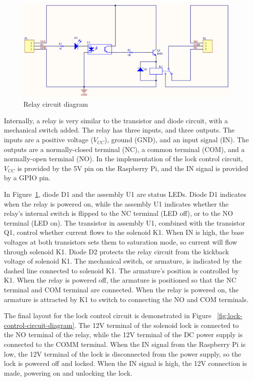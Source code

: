 \documentclass[12pt]{report}
\begin{document}
\begin{figure}
    \includegraphics[width=\textwidth]{Diagrams/Hardware-Diagrams/relay_circuit}
    \caption[Relay circuit diagram]{Relay circuit diagram~\autocite{RELAYCIRCUIT}}
    \label{fig:relay-circuit-diagram}
\end{figure}

Internally, a relay is very similar to the transistor and diode circuit, with a mechanical switch added. The relay 
has three inputs, and three outputs. The inputs are a positive voltage ($ V_{CC} $), ground (GND), and an input signal 
(IN). The outputs are a normally-closed terminal (NC), a common terminal (COM), and a normally-open terminal (NO). In 
the implementation of the lock control circuit, $ V_{CC} $ is provided by the 5V pin on the Raspberry Pi, and the IN
signal is provided by a GPIO pin.

In Figure~\ref{fig:relay-circuit-diagram}, diode D1 and the assembly U1 are status LEDs. Diode D1 indicates when the 
relay is powered on, while the assembly U1 indicates whether the relay's internal switch is flipped to the NC terminal 
(LED off), or to the NO terminal (LED on). The transistor in assembly U1, combined with the transistor Q1, control 
whether current flows to the solenoid K1. When IN is high, the base voltages at both transistors sets them to 
saturation mode, so current will flow through solenoid K1. Diode D2 protects the relay circuit from the kickback 
voltage of solenoid K1. The mechanical switch, or armature, is indicated by the dashed line connected to solenoid K1. 
The armature's position is controlled by K1. When the relay is powered off, the armature is positioned so that the NC 
terminal and COM terminal are connected. When the relay is powered on, the armature is attracted by K1 to switch to 
connecting the NO and COM terminals.

The final layout for the lock control circuit is demonstrated in Figure ~\ref{fig:lock-control-circuit-diagram}. The 
12V terminal of the solenoid lock is connected to the NO terminal of the relay, while the 12V terminal of the DC power 
supply is connected to the COMM terminal. When the IN signal from the Raspberry Pi is low, the 12V terminal of the lock 
is disconnected from the power supply, so the lock is powered off and locked. When the IN signal is high, the 12V 
connection is made, powering on and unlocking the lock.
\end{document}

